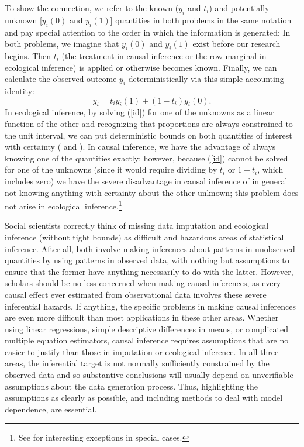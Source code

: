 \documentclass[11pt,titlepage]{article}
\begin{document}
To show the connection, we refer to the known ($y_i$ and $t_i$) and
potentially unknown [$y_i(0)$ and $y_i(1)$] quantities in both
problems in the same notation and pay special attention to the order
in which the information is generated: In both problems, we imagine
that $y_i(0)$ and $y_i(1)$ exist before our research begins.  Then
$t_i$ (the treatment in causal inference or the row marginal in
ecological inference) is applied or otherwise becomes known.  Finally,
we can calculate the observed outcome $y_i$ deterministically via this
simple accounting identity:
\begin{equation}
  \label{id}
  y_i = t_iy_i(1) + (1-t_i)y_i(0).
\end{equation}
In ecological inference, by solving (\ref{id}) for one of the unknowns
as a linear function of the other and recognizing that proportions are
always constrained to the unit interval, we can put deterministic
bounds on both quantities of interest with certainty
(\citealp{DunDav53} and \citealp[][ch.5]{King97}).  In causal
inference, we have the advantage of always knowing one of the
quantities exactly; however, because (\ref{id}) cannot be solved for
one of the unknowns (since it would require dividing by $t_i$ or
$1-t_i$, which includes zero) we have the severe disadvantage in
causal inference of in general not knowing anything with certainty
about the other unknown; this problem does not arise in ecological
inference.\footnote{See \citet{Manski95} for interesting exceptions in
  special cases.}

Social scientists correctly think of missing data imputation and
ecological inference (without tight bounds) as difficult and hazardous
areas of statistical inference.  After all, both involve making
inferences about patterns in unobserved quantities by using patterns
in observed data, with nothing but assumptions to ensure that the
former have anything necessarily to do with the latter.  However,
scholars should be no less concerned when making causal inferences, as
every causal effect ever estimated from observational data involves
these severe inferential hazards.  If anything, the specific problems
in making causal inferences are even more difficult than most
applications in these other areas.  Whether using linear regressions,
simple descriptive differences in means, or complicated multiple
equation estimators, causal inference requires assumptions that are no
easier to justify than those in imputation or ecological inference.
In all three areas, the inferential target is not normally
sufficiently constrained by the observed data and so substantive
conclusions will usually depend on unverifiable assumptions about the
data generation process.  Thus, highlighting the assumptions as
clearly as possible, and including methods to deal with model
dependence, are essential.
\end{document}
